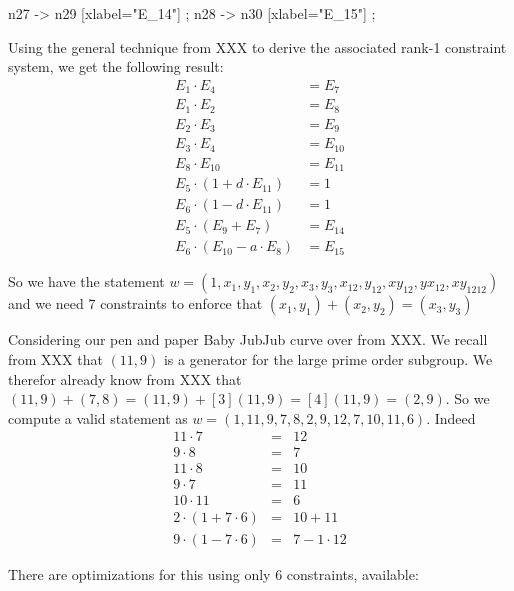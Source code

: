 \begin{center}
{    n27 -> n29 [xlabel="E_14"] ;
    n28 -> n30 [xlabel="E_15"] ;
    
}
\end{center}
Using the general technique from XXX to derive the associated rank-1 constraint system, we get the following result:
\begin{align*}
E_1 \cdot E_4 & = E_7 \\
E_1 \cdot E_2 & = E_8 \\
E_2 \cdot E_3 & = E_9 \\
E_3 \cdot E_4 & = E_{10} \\
E_8 \cdot E_{10} & = E_{11} \\
E_5 \cdot (1+ d\cdot E_{11}) & = 1 \\
E_6 \cdot (1 - d\cdot E_{11}) & = 1 \\
E_5 \cdot (E_9 + E_7) & = E_{14} \\
E_6 \cdot (E_{10} - a\cdot E_8) & = E_{15}
\end{align*}

So we have the statement $w=(1,x_1,y_1,x_2,y_2,x_3,y_3,x_{12},y_{12},xy_{12},yx_{12},xy_{1212})$ and we need 7 constraints to enforce that $(x_1,y_1)+(x_2,y_2)=(x_3,y_3)$ 
\begin{example}
Considering our pen and paper Baby JubJub curve over from XXX. We recall from XXX that $(11,9)$ is a generator for the large prime order subgroup. We therefor already know from XXX that
$(11,9) + (7,8) = (11,9) + [3](11,9) = [4](11,9) = (2,9)$. So we compute a valid statement as 
$w=(1,11,9,7,8,2,9,12,7,10,11,6)$. Indeed
$$
\begin{array}{lcl}
11\cdot 7 &=& 12\\
9\cdot 8 &=& 7\\
11\cdot 8 &=& 10\\
9\cdot 7 &=& 11\\
10\cdot 11 &=& 6\\
2\cdot (1+7\cdot 6) &=& 10 + 11\\
9\cdot (1-7\cdot 6) &=& 7 -1\cdot 12
\end{array}
$$
\end{example}
There are optimizations for this using only 6 constraints, available:

